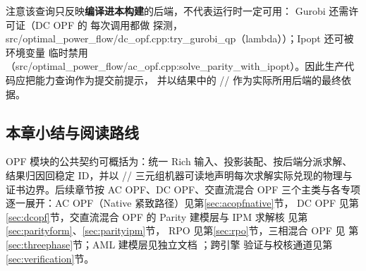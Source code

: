 注意该查询只反映\textbf{编译进本构建}的后端，不代表运行时一定可用：
Gurobi 还需许可证（DC OPF 的  每次调用都做
 探测，src/optimal\_power\_flow/dc\_opf.cpp:try\_gurobi\_qp（lambda））；Ipopt 还可被环境变量
 临时禁用
（src/optimal\_power\_flow/ac\_opf.cpp:solve\_parity\_with\_ipopt）。因此生产代码应把能力查询作为提交前提示，
并以结果中的 //
 作为实际所用后端的最终依据。

\subsection{本章小结与阅读路线}\label{subsec:overview-reading}

OPF 模块的公共契约可概括为：统一 Rich 输入、投影装配、按后端分派求解、
结果归因回稳定 ID，并以 //
 三元组机器可读地声明每次求解实际兑现的物理与
证书边界。后续章节按 AC OPF、DC OPF、交直流混合 OPF 三个主类与各专项
逐一展开：AC OPF（Native 紧致路径）见第\ref{sec:acopfnative}节，
DC OPF 见第\ref{sec:dcopf}节，交直流混合 OPF 的 Parity 建模层与 IPM 求解核
见第\ref{sec:parityform}、\ref{sec:parityipm}节，
RPO 见第\ref{sec:rpo}节，三相混合 OPF 见
第\ref{sec:threephase}节；AML 建模层见独立文档
；跨引擎
验证与校核通道见第\ref{sec:verification}节。
